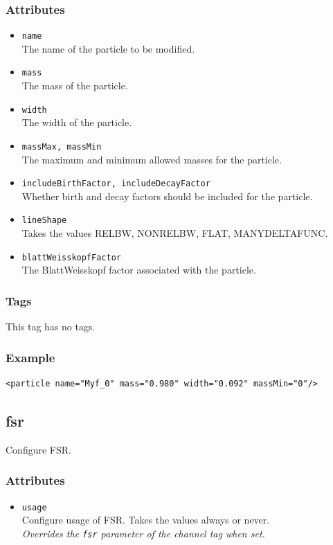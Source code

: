 \subsubsection*{Attributes}
\begin{itemize}
\item{\tt name}\\
      The name of the particle to be modified.
\item{\tt mass}\\
      The mass of the particle.
\item{\tt width}\\
      The width of the particle.
\item{\tt massMax, massMin}\\
      The maximum and minimum allowed masses for the particle.
\item{\tt includeBirthFactor, includeDecayFactor}\\
      Whether birth and decay factors should be included for the particle.
\item{\tt lineShape}\\
      Takes the values RELBW, NONRELBW, FLAT, MANYDELTAFUNC.
\item{\tt blattWeisskopfFactor}\\
      The BlattWeisskopf factor associated with the particle.
\end{itemize}
\subsubsection*{Tags}
This tag has no tags.
\subsubsection*{Example}
{\footnotesize
\begin{verbatim}
<particle name="Myf_0" mass="0.980" width="0.092" massMin="0"/>
\end{verbatim}
}

\subsection{fsr}
Configure FSR.
\subsubsection*{Attributes}
\begin{itemize}
\item{\tt usage}\\
      Configure usage of FSR. Takes the values always or never.\\
      \emph{Overrides the {\tt fsr} parameter of the channel tag when set.}
\end{itemize}
